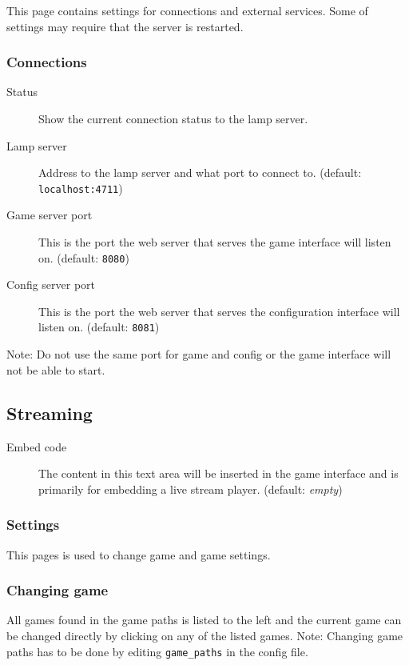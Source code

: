This page contains settings for connections and external services.
Some of settings may require that the server is restarted.

\subsubsection{Connections}

  \begin{description}

    \item[Status]
        Show the current connection status to the lamp server.
    \item[Lamp server]
        Address to the lamp server and what port to connect to. (default:
        \texttt{localhost:4711})
    \item[Game server port]
        This is the port the web server that serves the game interface will
        listen on. (default: \texttt{8080})
    \item[Config server port]
        This is the port the web server that serves the configuration
        interface will listen on. (default: \texttt{8081})

  \end{description}

  Note: Do not use the same port for game and config or the game interface
  will not be able to start.

\subsection{Streaming}
  \begin{description}
    \item[Embed code]
        The content in this text area will be inserted in the game interface
        and is primarily for embedding a live stream player. (default:
        \textit{empty})
  \end{description}


\subsubsection{Settings}
This pages is used to change game and game settings.

\subsubsection{Changing game}
All games found in the game paths is listed to the left and the current game
can be changed directly by clicking on any of the listed games.  Note:
Changing game paths has to be done by editing \texttt{game\_paths} in the
config file.


